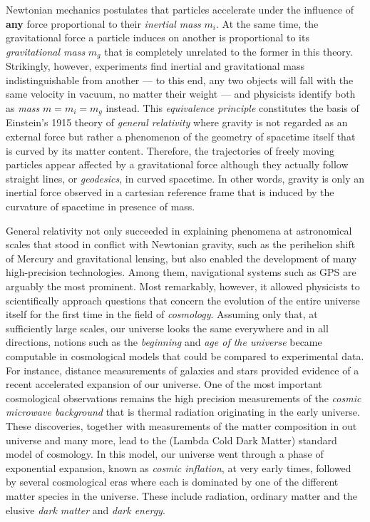 \documentclass[12pt,parskip=half]{scrreprt}
\newcommand{\addref}{\todo[color=black!20]{ref.}}
\begin{document}
Newtonian mechanics postulates that particles accelerate under the influence of \textbf{any} force proportional to their \emph{inertial mass} \(m_i\). At the same time, the gravitational force a particle induces on another is proportional to its \emph{gravitational mass} \(m_g\) that is completely unrelated to the former in this theory. Strikingly, however, experiments find inertial and gravitational mass indistinguishable from another  --- to this end, any two objects will fall with the same velocity in vacuum, no matter their weight --- and physicists identify both as \emph{mass} \(m=m_i=m_g\) instead. This \emph{equivalence principle} constitutes the basis of Einstein's 1915 theory of \emph{general relativity} where gravity is not regarded as an external force but rather a phenomenon of the geometry of spacetime itself that is curved by its matter content. Therefore, the trajectories of freely moving particles appear affected by a gravitational force although they actually follow straight lines, or \emph{geodesics}, in curved spacetime. In other words, gravity is only an inertial force observed in a cartesian reference frame that is induced by the curvature of spacetime in presence of mass.

General relativity not only succeeded in explaining phenomena at astronomical scales that stood in conflict with Newtonian gravity, such as the perihelion shift of Mercury and gravitational lensing, \addref but also enabled the development of many high-precision technologies. Among them, navigational systems such as GPS are arguably the most prominent. \addref Most remarkably, however, it allowed physicists to scientifically approach questions that concern the evolution of the entire universe itself for the first time in the field of \emph{cosmology}. Assuming only that, at sufficiently large scales, our universe looks the same everywhere and in all directions, notions such as the \emph{beginning} and \emph{age of the universe} became computable in cosmological models that could be compared to experimental data. For instance, distance measurements of galaxies and stars provided evidence of a recent accelerated expansion of our universe. One of the most important cosmological observations remains the high precision measurements of the \emph{cosmic microwave background} that is thermal radiation originating in the early universe. \addref These discoveries, together with measurements of the matter composition in out universe and many more, lead to the \LCDM (Lambda Cold Dark Matter) standard model of cosmology. \addref In this model, our universe went through a phase of exponential expansion, known as \emph{cosmic inflation}, at very early times, followed by several cosmological eras where each is dominated by one of the different matter species in the universe. These include radiation, ordinary matter and the elusive \emph{dark matter} and \emph{dark energy}.
\end{document}
